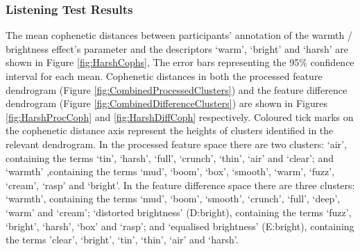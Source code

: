 		\subsubsection{Listening Test Results}
			The mean cophenetic distances between participants' annotation of the warmth / brightness effect's
			parameter and the descriptors `warm', `bright' and `harsh' are shown in Figure
			\ref{fig:HarshCophs}, The error bars representing the 95\% confidence interval for each mean.
			Cophenetic distances in both the processed feature dendrogram (Figure
			\ref{fig:CombinedProcessedClusters}) and the feature difference dendrogram (Figure
			\ref{fig:CombinedDifferenceClusters}) are shown in Figures \ref{fig:HarshProcCoph} and
			\ref{fig:HarshDiffCoph} respectively. Coloured tick marks on the cophenetic distance axis represent
			the heights of clusters identified in the relevant dendrogram. In the processed feature space there
			are two clusters: `air', containing the terms `tin', `harsh', `full', `crunch', `thin', `air' and
			`clear'; and `warmth' ,containing the terms `mud', `boom', `box', `smooth', `warm', `fuzz',
			`cream', `rasp' and `bright'. In the feature difference space there are three clusters: `warmth',
			containing the terms `mud', `boom', `smooth', `crunch', `full', `deep', `warm' and `cream';
			`distorted brightness' (D:bright), containing the terms `fuzz', `bright', `harsh', `box' and
			`rasp'; and `equalised brightness' (E:bright), containing the terms 'clear', `bright', `tin',
			`thin', `air' and `harsh'.

